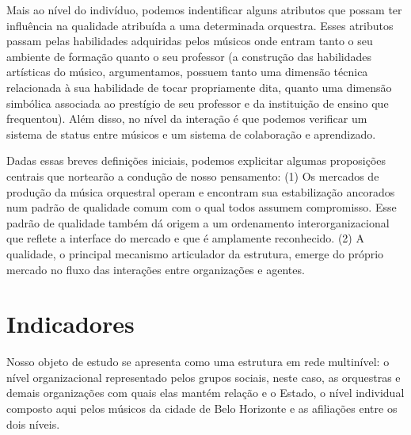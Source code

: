 \documentclass[a4paper, 12pt, openright, oneside, german, french, english, brazil]{abntex2}
\begin{document}
	Mais ao nível do indivíduo, podemos indentificar alguns atributos que possam ter influência na qualidade atribuída a uma determinada orquestra. Esses atributos passam pelas habilidades adquiridas pelos músicos onde entram tanto o seu ambiente de formação quanto o seu professor (a construção das habilidades artísticas do músico, argumentamos, possuem tanto uma dimensão técnica relacionada à sua habilidade de tocar propriamente dita, quanto uma dimensão simbólica associada ao prestígio de seu professor e da instituição de ensino que frequentou). Além disso, no nível da interação é que podemos verificar um sistema de status entre músicos e um sistema de colaboração e aprendizado.

	Dadas essas breves definições iniciais, podemos explicitar algumas proposições centrais que nortearão a condução de nosso pensamento: (1) Os mercados de produção da música orquestral operam e encontram sua estabilização ancorados num padrão de qualidade comum com o qual todos assumem compromisso. Esse padrão de qualidade também dá origem a um ordenamento interorganizacional que reflete a interface do mercado e que é amplamente reconhecido. (2) A qualidade, o principal mecanismo articulador da estrutura, emerge do próprio mercado no fluxo das interações entre organizações e agentes. 

        \section{Indicadores}\label{sec:geradores_nomes}
	
	
	Nosso objeto de estudo se apresenta como uma estrutura em rede multinível: o nível organizacional representado pelos grupos sociais, neste caso, as orquestras e demais organizações com quais elas mantém relação e o Estado, o nível individual composto aqui pelos músicos da cidade de Belo Horizonte e as afiliações entre os dois níveis.
	

	
\end{document}

